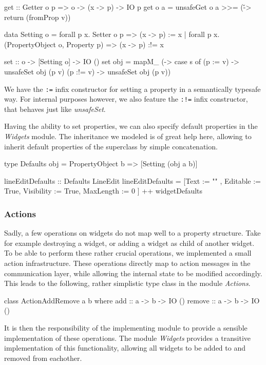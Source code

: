 \documentclass[11pt,a4paper]{article}
\begin{document}
\begin{haskell}
get :: Getter o p => o -> (x -> p) -> IO p
get o a = unsafeGet o a >>= (\v -> return (fromProp v))

data Setting o
  = forall p x. Setter o p => (x -> p) := x
  | forall p x. (PropertyObject o, Property p) => (x -> p) :!= x

set :: o -> [Setting o] -> IO ()
set obj = mapM_ (\s -> case s of
                         (p := v)  -> unsafeSet obj (p v)
                         (p :!= v) -> unsafeSet obj (p v))
\end{haskell}

We have the \texttt{:=} infix constructor for setting a property in a semantically typesafe way.
For internal purposes however, we also feature the \texttt{:!=} infix constructor, that behaves just like \textit{unsafeSet}.

Having the ability to set properties, we can also specify default properties in the \textit{Widgets} module.
The inheritance we modeled is of great help here, allowing to inherit default properties of the superclass by simple concatenation.
\begin{haskell}
type Defaults obj = PropertyObject b => [Setting (obj a b)]

lineEditDefaults :: Defaults LineEdit
lineEditDefaults = [Text       := ""  ,
                    Editable   := True,
                    Visibility := True,
                    MaxLength  := 0   ]
                   ++ widgetDefaults
\end{haskell}

\subsubsection{Actions}
Sadly, a few operations on widgets do not map well to a property structure.
Take for example destroying a widget, or adding a widget as child of another widget.
To be able to perform these rather crucial operations, we implemented a small action infrastructure.
These operations directly map to action messages in the communication layer, while allowing the internal state to be modified accordingly.
This leads to the following, rather simplistic type class in the module \textit{Actions}.

\begin{haskell}
class ActionAddRemove a b where
    add :: a -> b -> IO ()
    remove :: a -> b -> IO ()
\end{haskell}

It is then the responsibility of the implementing module to provide a sensible implementation of these operations.
The module \textit{Widgets} provides a transitive implementation of this functionality, allowing all widgets to be added to and removed from eachother.
\end{document}
